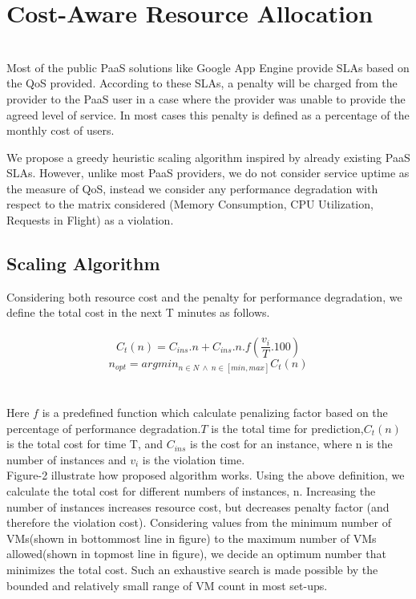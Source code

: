 \section{Cost-Aware Resource Allocation}\\
Most of the public PaaS solutions like Google App Engine provide SLAs based on the QoS provided. According to these SLAs, a penalty will be charged from the provider to the PaaS user in a case where the provider was unable to provide the agreed level of service. In most cases this penalty is defined as a percentage of the monthly cost of users.

We propose a greedy heuristic scaling algorithm inspired by already existing PaaS SLAs. However, unlike most PaaS providers, we do not consider service uptime as the measure of QoS, instead we consider any performance degradation with respect to the matrix considered (Memory Consumption, CPU Utilization, Requests in Flight) as a violation.

\subsection{Scaling Algorithm}
Considering both resource cost and the penalty for performance degradation, we define the total cost in the next T minutes as follows.\\
\\
\textbf{$$ C_t(n) = C_{ins}.n  + C_{ins} . n . f(\frac{v_i}{T}.100) $$}
\textbf{$$n_{opt} = argmin_{n \in N \ \land \ n \in [min, max]}C_t(n)$$} \\
\\

Here $f$ is a predefined function which calculate penalizing factor based on the percentage of performance degradation.$T$ is the total time for prediction,$C_t(n)$ is the total cost for time T, and $C_{ins}$ is the cost for an instance, where n is the number of instances and $v_i$ is the violation time. 
\\
Figure-2 illustrate how proposed algorithm works. Using the above definition, we calculate the total cost for different numbers of instances, n. Increasing the number of instances increases resource cost, but decreases penalty factor (and therefore the violation cost). Considering values from the minimum number of VMs(shown in bottommost line in figure) to the maximum number of VMs allowed(shown in topmost line in figure), we decide an optimum number that minimizes the total cost. Such an exhaustive search is made possible by the bounded and relatively small range of VM count in most set-ups.